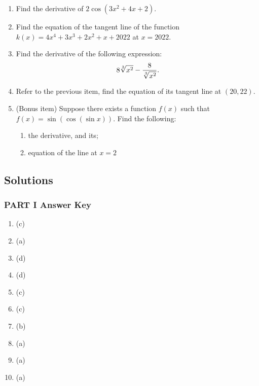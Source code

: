 \documentclass[10pt,paper=letter]{scrartcl}
\begin{document}
\begin{enumerate}[resume, label=\arabic*.,font=\bfseries]

\item Find the derivative of $2\cos (3x^2 + 4x + 2)$.

\item Find the equation of the tangent line of the function $k(x) = 4x^4 + 3x^3 +2x^2 + x + 2022$ at $x=2022.$


\item Find the derivative of the following expression: $$8\sqrt[3]{x^2} - \dfrac{8}{\sqrt[3]{x^2}}.$$

\item Refer to the previous item, find the equation of its tangent line at $(20, 22)$.

\item (Bonus item) Suppose there exists a function $f(x)$ such that $f(x) = \sin (\cos (\sin x))$. Find the following:

\begin{enumerate}
    \item[(a)] the derivative, and its;
    \item[(b)] equation of the line at $x=2$
\end{enumerate}

\end{enumerate}


\newpage

\subsection{Solutions}


\subsubsection{PART I Answer Key}

\begin{enumerate}[label=\arabic*.,font=\bfseries]
\item (c)
\item (a)
\item (d)
\item (d)
\item (c)
\item (c)
\item (b)
\item (a)
\item (a)
\item (a)  
\end{enumerate}
\end{document}

